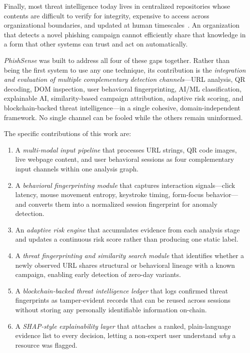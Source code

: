 \documentclass[conference]{IEEEtran}
\begin{document}
Finally, most threat intelligence today lives in centralized repositories whose contents are
difficult to verify for integrity, expensive to access across organizational boundaries, and
updated at human timescales~\cite{ref11}.
An organization that detects a novel phishing campaign cannot efficiently share that knowledge
in a form that other systems can trust and act on automatically.

\textit{PhishSense} was built to address all four of these gaps together.
Rather than being the first system to use any one technique, its contribution is the
\textit{integration and evaluation of multiple complementary detection channels}---URL analysis,
QR decoding, DOM inspection, user behavioral fingerprinting, AI/ML classification, explainable AI,
similarity-based campaign attribution, adaptive risk scoring, and blockchain-backed threat
intelligence---in a single cohesive, domain-independent framework.
No single channel can be fooled while the others remain uninformed.

The specific contributions of this work are:
\begin{enumerate}[leftmargin=*,nosep]
\item A \textit{multi-modal input pipeline} that processes URL strings, QR code images, live
      webpage content, and user behavioral sessions as four complementary input channels within
      one analysis graph.
\item A \textit{behavioral fingerprinting module} that captures interaction signals---click
      latency, mouse movement entropy, keystroke timing, form-focus behavior---and converts them
      into a normalized session fingerprint for anomaly detection.
\item An \textit{adaptive risk engine} that accumulates evidence from each analysis stage and
      updates a continuous risk score rather than producing one static label.
\item A \textit{threat fingerprinting and similarity search module} that identifies whether a
      newly observed URL shares structural or behavioral lineage with a known campaign, enabling
      early detection of zero-day variants.
\item A \textit{blockchain-backed threat intelligence ledger} that logs confirmed threat
      fingerprints as tamper-evident records that can be reused across sessions without storing
      any personally identifiable information on-chain.
\item A \textit{SHAP-style explainability layer} that attaches a ranked, plain-language evidence
      list to every decision, letting a non-expert user understand \textit{why} a resource was
      flagged.
\end{enumerate}
\end{document}
